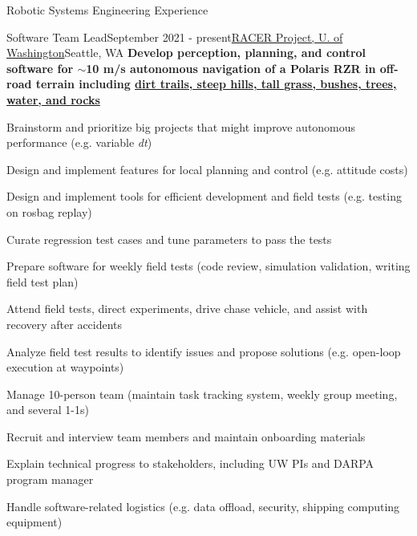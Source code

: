 \documentclass{resume} %
\begin{document}
\begin{rSection}{Robotic Systems Engineering Experience}

\begin{rSubsection}{Software Team Lead}{September 2021 - present}{\href{https://www.apl.uw.edu/project/project.php?id=racer}{RACER Project, U. of Washington}}{Seattle, WA}
{\bf\small Develop perception, planning, and control software for $\sim$10 m/s autonomous navigation of a Polaris RZR in off-road terrain including \href{https://www.youtube.com/watch?v=AlNOzhza7pg}{dirt trails, steep hills, tall grass, bushes, trees, water, and rocks}}
\item Brainstorm and prioritize big projects that might improve autonomous performance (e.g. variable {\it dt})
\item Design and implement features for local planning and control (e.g. attitude costs)
\item Design and implement tools for efficient development and field tests (e.g. testing on rosbag replay)
\item Curate regression test cases and tune parameters to pass the tests
\item Prepare software for weekly field tests (code review, simulation validation, writing field test plan)
\item Attend field tests, direct experiments, drive chase vehicle, and assist with recovery after accidents
\item Analyze field test results to identify issues and propose solutions (e.g. open-loop execution at waypoints)
\item Manage 10-person team (maintain task tracking system, weekly group meeting, and several 1-1s)
\item Recruit and interview team members and maintain onboarding materials
\item Explain technical progress to stakeholders, including UW PIs and DARPA program manager
\item Handle software-related logistics (e.g. data offload, security, shipping computing equipment)
\end{rSubsection}


\end{rSection}
\end{document}
